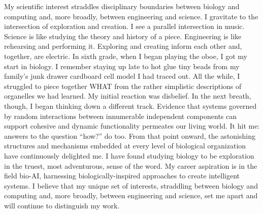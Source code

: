 
My scientific interest straddles disciplinary boundaries between biology and computing and, more broadly, between engineering and science.
I gravitate to the intersection of exploration and creation.
I see a parallel intersection in music.
Science is like studying the theory and history of a piece.
Engineering is like rehearsing and performing it.
Exploring and creating inform each other and, together, are electric.
In sixth grade, when I began playing the oboe, I got my start in biology.
I remember staying up late to hot glue tiny beads from my family's junk drawer cardboard cell model I had traced out.
All the while, I struggled to piece together WHAT from the rather simplistic descriptions of organelles we had learned.
My initial reaction was disbelief.
In the next breath, though, I began thinking down a different track.
Evidence that systems governed by random interactions between innumerable independent components can support cohesive and dynamic functionality permeates our living world.
It hit me: answers to the question ``how?'' do too.
From that point onward, the astonishing structures and mechanisms embedded at every level of biological organization have continuously delighted me.
I have found studying biology to be exploration in the truest, most adventurous, sense of the word.
My career aspiration is in the field bio-AI, harnessing biologically-inspired approaches to create intelligent systems.
I believe that my unique set of interests, straddling between biology and computing and, more broadly, between engineering and science, set me apart and will continue to distinguish my work.
